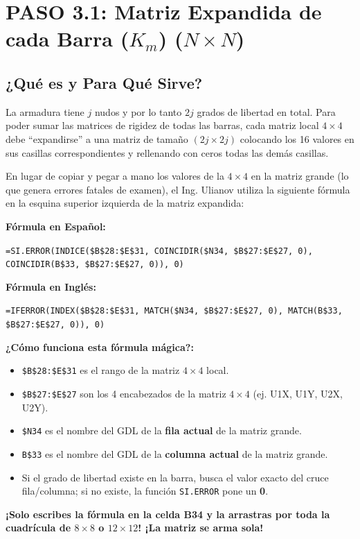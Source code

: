 \documentclass[10pt,a4paper]{article}
\begin{document}
\section{PASO 3.1: Matriz Expandida de cada Barra (\texorpdfstring{$K_m$}{Km}) (\texorpdfstring{$N \times N$}{NxN})}

\subsection{¿Qué es y Para Qué Sirve?}
La armadura tiene $j$ nudos y por lo tanto $2j$ grados de libertad en total. Para poder sumar las matrices de rigidez de todas las barras, cada matriz local $4\times 4$ debe ``expandirse'' a una matriz de tamaño $(2j \times 2j)$ colocando los 16 valores en sus casillas correspondientes y rellenando con ceros todas las demás casillas.

\begin{excelbox}
En lugar de copiar y pegar a mano los valores de la $4\times 4$ en la matriz grande (lo que genera errores fatales de examen), el Ing. Ulianov utiliza la siguiente fórmula en la esquina superior izquierda de la matriz expandida:

\vspace{0.15cm}
\noindent\textbf{Fórmula en Español:}
\begin{center}
\texttt{=SI.ERROR(INDICE(\$B\$28:\$E\$31, COINCIDIR(\$N34, \$B\$27:\$E\$27, 0), COINCIDIR(B\$33, \$B\$27:\$E\$27, 0)), 0)}
\end{center}

\noindent\textbf{Fórmula en Inglés:}
\begin{center}
\texttt{=IFERROR(INDEX(\$B\$28:\$E\$31, MATCH(\$N34, \$B\$27:\$E\$27, 0), MATCH(B\$33, \$B\$27:\$E\$27, 0)), 0)}
\end{center}

\textbf{¿Cómo funciona esta fórmula mágica?:}
\begin{itemize}
    \item \texttt{\$B\$28:\$E\$31} es el rango de la matriz $4\times 4$ local.
    \item \texttt{\$B\$27:\$E\$27} son los 4 encabezados de la matriz $4\times 4$ (ej. U1X, U1Y, U2X, U2Y).
    \item \texttt{\$N34} es el nombre del GDL de la \textbf{fila actual} de la matriz grande.
    \item \texttt{B\$33} es el nombre del GDL de la \textbf{columna actual} de la matriz grande.
    \item Si el grado de libertad existe en la barra, busca el valor exacto del cruce fila/columna; si no existe, la función \texttt{SI.ERROR} pone un \textbf{0}.
\end{itemize}
\textbf{¡Solo escribes la fórmula en la celda B34 y la arrastras por toda la cuadrícula de $8\times 8$ o $12\times 12$! ¡La matriz se arma sola!}
\end{excelbox}
\end{document}
